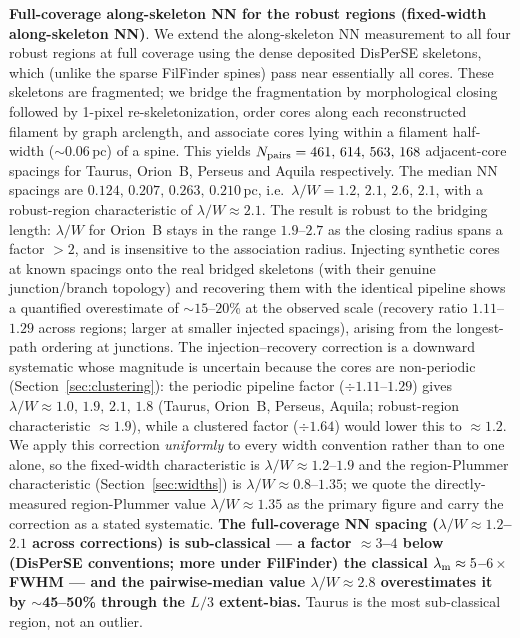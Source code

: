 \documentclass[usenatbib,twoside,twocolumn]{mnras}
\begin{document}
\textbf{Full-coverage along-skeleton NN for the robust regions (fixed-width along-skeleton NN)}. We extend the along-skeleton NN measurement to all four robust regions at full coverage using the dense deposited DisPerSE skeletons, which (unlike the sparse FilFinder spines) pass near essentially all cores. These skeletons are fragmented; we bridge the fragmentation by morphological closing followed by 1-pixel re-skeletonization, order cores along each reconstructed filament by graph arclength, and associate cores lying within a filament half-width ($\sim$0.06\,pc) of a spine. This yields $N_{\rm pairs} = 461,\,614,\,563,\,168$ adjacent-core spacings for Taurus, Orion~B, Perseus and Aquila respectively. The median NN spacings are $0.124,\,0.207,\,0.263,\,0.210$\,pc, i.e.\ $\lambda/W = 1.2,\,2.1,\,2.6,\,2.1$, with a robust-region characteristic of $\lambda/W \approx 2.1$. The result is robust to the bridging length: $\lambda/W$ for Orion~B stays in the range $1.9$--$2.7$ as the closing radius spans a factor $>2$, and is insensitive to the association radius. Injecting synthetic cores at known spacings onto the real bridged skeletons (with their genuine junction/branch topology) and recovering them with the identical pipeline shows a quantified overestimate of $\sim$$15$--$20$\% at the observed scale (recovery ratio $1.11$--$1.29$ across regions; larger at smaller injected spacings), arising from the longest-path ordering at junctions. The injection--recovery correction is a downward systematic whose magnitude is uncertain because the cores are non-periodic (Section~\ref{sec:clustering}): the periodic pipeline factor ($\div1.11$--$1.29$) gives $\lambda/W\approx1.0,\,1.9,\,2.1,\,1.8$ (Taurus, Orion~B, Perseus, Aquila; robust-region characteristic $\approx1.9$), while a clustered factor ($\div1.64$) would lower this to $\approx1.2$. We apply this correction \emph{uniformly} to every width convention rather than to one alone, so the fixed-width characteristic is $\lambda/W\approx1.2$--$1.9$ and the region-Plummer characteristic (Section~\ref{sec:widths}) is $\lambda/W\approx0.8$--$1.35$; we quote the directly-measured region-Plummer value $\lambda/W\approx1.35$ as the primary figure and carry the correction as a stated systematic. \textbf{The full-coverage NN spacing ($\lambda/W\approx1.2$--$2.1$ across corrections) is sub-classical --- a factor $\approx3$--$4$ below (DisPerSE conventions; more under FilFinder) the classical $\lambda_{\rm m}\approx5$--$6\times$FWHM --- and the pairwise-median value $\lambda/W\approx2.8$ overestimates it by $\sim$45--50\% through the $L/3$ extent-bias.} Taurus is the most sub-classical region, not an outlier.
\end{document}

